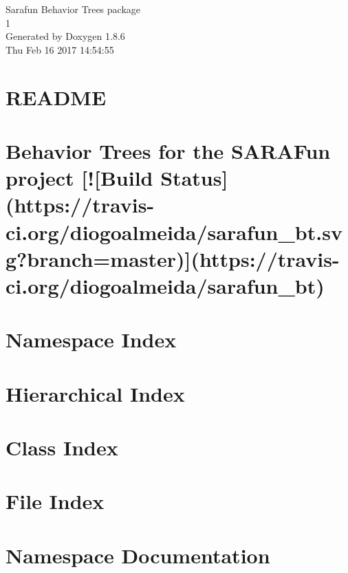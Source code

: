 \documentclass[twoside]{book}
\newcommand{\clearemptydoublepage}{%
  \newpage{\pagestyle{empty}\cleardoublepage}%
}
\begin{document}
\hypersetup{pageanchor=false}
\begin{titlepage}
\vspace*{7cm}
\begin{center}%
{\Large Sarafun Behavior Trees package \\[1ex]\large 1 }\\
\vspace*{1cm}
{\large Generated by Doxygen 1.8.6}\\
\vspace*{0.5cm}
{\small Thu Feb 16 2017 14:54:55}\\
\end{center}
\end{titlepage}
\clearemptydoublepage
\tableofcontents
\clearemptydoublepage
{}
\hypersetup{pageanchor=true}

\chapter{R\-E\-A\-D\-M\-E}
\label{md_docs_README}
\hypertarget{md_docs_README}{}

\chapter{Behavior Trees for the S\-A\-R\-A\-Fun project \mbox{[}!\mbox{[}Build Status\mbox{]}(https\-://travis-\/ci.org/diogoalmeida/sarafun\-\_\-bt.svg?branch=master)\mbox{]}(https\-://travis-\/ci.org/diogoalmeida/sarafun\-\_\-bt)}
\label{md_README}
\hypertarget{md_README}{}

\chapter{Namespace Index}

\chapter{Hierarchical Index}

\chapter{Class Index}

\chapter{File Index}

\chapter{Namespace Documentation}





\end{document}
